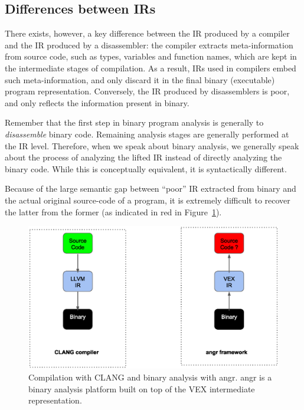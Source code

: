 \documentclass{article}
\begin{document}
\subsection{Differences between IRs}
There exists, however, a key difference between the IR produced by a compiler and the IR produced by a disassembler: the compiler extracts meta-information from source code, such as types, variables and function names, which are kept in the intermediate stages of compilation. As a result, IRs used in compilers embed such meta-information, and only discard it in the final binary (executable) program representation.
Conversely, the IR produced by disassemblers is poor, and only reflects the information present in binary.

Remember that the first step in binary program analysis is generally to \emph{disassemble} binary code. Remaining analysis stages are generally performed at the IR level. Therefore, when we speak about binary analysis, we generally speak about the process of analyzing the lifted IR instead of directly analyzing the binary code. While this is conceptually equivalent, it is syntactically different.

Because of the large semantic gap between ``poor'' IR extracted from binary and the actual original source-code of a program, it is extremely difficult to recover the latter from the former (as indicated in red in Figure~\ref{fig:compilation}).


	\begin{figure}[h]
		\centering
		\includegraphics[width=.9\textwidth]{compilation.eps}
		\caption{Compilation with CLANG and binary analysis with angr. angr is a binary analysis platform built on top of the VEX intermediate representation.}
		\label{fig:compilation}
	\end{figure}
\end{document}
